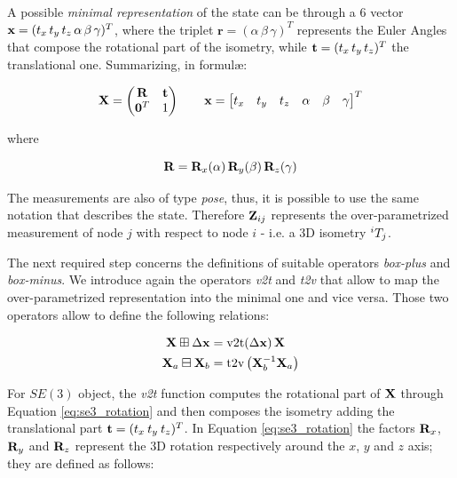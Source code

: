 A possible \textit{minimal representation} of the state can be through a $6$ vector $\mathbf{x} = (t_x\,t_y\,t_z\,\alpha\,\beta\,\gamma)^T$, where the triplet $\mathbf{r} = (\alpha\,\beta\,\gamma)^T$ represents the Euler Angles that compose the rotational part of the isometry, while $\mathbf{t} = (t_x\,t_y\,t_z)^T$ the translational one. Summarizing, in formul\ae:

\begin{equation*}
    \mathbf{X} = 
        \begin{pmatrix}
            \mathbf{R} & \mathbf{t} \\ \mathbf{0}^T & 1
        \end{pmatrix}
    \qquad 
    \mathbf{x} = \begin{bmatrix} t_x & t_y & t_z & \alpha & \beta & \gamma \end{bmatrix}^T
\end{equation*}

\noindent where

\begin{equation}
    \label{eq:se3_rotation}
    \mathbf{R} = \mathbf{R}_x(\alpha) \, \mathbf{R}_y(\beta)\, \mathbf{R}_z(\gamma)
\end{equation}

The measurements are also of type \textit{pose}, thus, it is possible to use the same notation that describes the state. Therefore $\mathbf{Z}_{ij}$ represents the over-parametrized measurement of node $j$ with respect to node $i$ - i.e. a 3D isometry $^{i}T_{j}$.

The next required step concerns the definitions of suitable operators \textit{box-plus} and \textit{box-minus}. We introduce again the operators \textit{v2t} and \textit{t2v} that allow to map the over-parametrized representation into the minimal one and vice versa. Those two operators allow to define the following relations:

\begin{align}
    \label{eq:standard_boxplus_se3}
    \SState \boxplus \dx &= \v2t(\dx) \, \SState \\
    \label{eq:standard_boxminus_se3}
    \SState_a \boxminus \SState_b &= \text{t2v}\left(\SState_b^{-1}\SState_a\right)
\end{align}

\noindent For $SE(3)$ object, the \textit{v2t} function computes the rotational part of $\mathbf{X}$ through Equation \ref{eq:se3_rotation} and then composes the isometry adding the translational part $\mathbf{t} = (t_x \: t_y \: t_z)^T$. In Equation \ref{eq:se3_rotation} the factors $\mathbf{R}_x$, $\mathbf{R}_y$ and $\mathbf{R}_z$ represent the 3D rotation respectively around the $x$, $y$ and $z$ axis; they are defined as follows:

